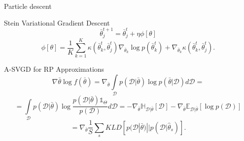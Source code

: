 \documentclass{beamer}
\begin{document}
\begin{frame}{Particle descent}
\begin{block}{Stein Variational Gradient Descent}
\[\bar{\theta}^{t+1}_j = \bar{\theta}^t_j + \eta \phi[\theta]\]
\[\phi[\theta] = \frac{1}{K} \sum^K_{k=1} \kappa(\bar{\theta}^t_k, \bar{\theta}^t_j)\nabla_{\bar{\theta}_k} \log p(\bar{\theta}^t_k) + \nabla_{\bar{\theta}_k} \kappa(\bar{\theta}^t_k, \bar{\theta}^t_j).\]
 
\end{block}
\begin{block}{A-SVGD for RP Approximations}
\[\nabla \bar{\theta} \log f(\bar{\theta}) = \nabla_{\bar{\theta}} \int\limits_{\mathcal{D}} p(\mathcal{D}|\bar{\theta}) \log p(\bar{\theta}|\mathcal{D}) d\mathcal{D} = \]
\[= \int\limits_{\mathcal{D}} p(\mathcal{D}|\bar{\theta}) \log \frac{p(\mathcal{D}|\bar{\theta}) \mathds{1}_{\Theta}}{p(\mathcal{D})} d\mathcal{D} = -\nabla_{\bar{\theta}} \mathbb{H}_{\mathcal{D}|\bar{\theta}}[\mathcal{D}] - \nabla_{\bar{\theta}} \mathbb{E}_{\mathcal{D}|\bar{\theta}}[\log p(\mathcal{D})]\]
\[= \nabla_{\bar{\theta}} \frac{1}{S} \displaystyle \sum_s KLD[p(\mathcal{D}|\bar{\theta}) || p(\mathcal{D}|\hat{\theta}_s)].\]
\end{block}
     
\end{frame}
\end{document}
